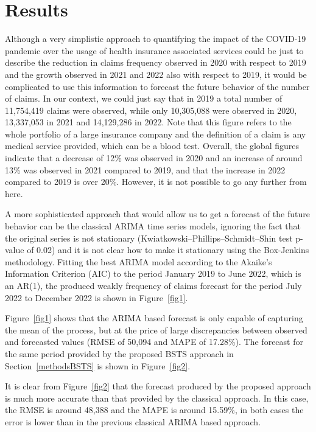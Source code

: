 \documentclass[]{risa}
\begin{document}
\section{Results}\label{results}
Although a very simplistic approach to quantifying the impact of the COVID-19 pandemic over the usage of health insurance associated services could be just to describe the reduction in claims frequency observed in 2020 with respect to  2019 and the growth observed in 2021 and 2022 also with respect to 2019, it would be complicated to use this information to forecast the future behavior of the number of claims. In our context, we could just say that in 2019 a total number of 11,754,419 claims were observed, while only 10,305,088 were observed in 2020, 13,337,053 in 2021 and 14,129,286 in 2022. Note that this figure refers to the whole portfolio of a large insurance company and the definition of a claim is any medical service provided, which can be a blood test. Overall, the global figures indicate that a decrease of 12\% was observed in 2020 and an increase of around 13\% was observed in 2021 compared to 2019, and that the increase in 2022 compared to 2019 is over 20\%. However, it is not possible to go any further from here. 

A more sophisticated approach that would allow us to get a forecast of the future behavior can be the classical ARIMA time series models, ignoring the fact that the original series is not stationary (Kwiatkowski–Phillips–Schmidt–Shin test p-value of 0.02) and it is not clear how to make it stationary using the Box-Jenkins methodology. Fitting the best ARIMA model according to the Akaike's Information Criterion (AIC) to the period January 2019 to June 2022, which is an AR(1), the produced weakly frequency of claims forecast for the period July 2022 to December 2022 is shown in Figure~\ref{fig1}. 


Figure~\ref{fig1} shows that the ARIMA based forecast is only capable of capturing the mean of the process, but at the price of large discrepancies between observed and forecasted values (RMSE of 50,094 and MAPE of 17.28\%). The forecast for the same period provided by the proposed BSTS approach in Section~\ref{methodsBSTS} is shown in Figure~\ref{fig2}.

It is clear from Figure~\ref{fig2} that the forecast produced by the proposed approach is much more accurate than that provided by the classical approach. In this case, the RMSE is around 48,388 and the MAPE is around 15.59\%, in both cases the error is lower than in the previous classical ARIMA based approach. 
\end{document}
